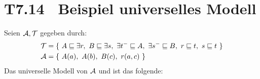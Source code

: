 \documentclass[fontsize=11pt, twoside=false, numbers=autoenddot]{scrbook}
\begin{document}
\newcommand{\BspUnivModell}{T7.14}
\section*{\hypertarget{BspUnivModell}{\BspUnivModell}~ Beispiel universelles Modell}

Seien $\mathcal{A},\mathcal{T}$ gegeben durch:
%
\begin{align*}
  \mathcal{T} & = \{\ A\sqsubseteq \exists r,\ B\sqsubseteq\exists s,\ \exists
  t^-\sqsubseteq A,\ \exists s^-\sqsubseteq B,\ r\sqsubseteq t,\
s\sqsubseteq t\ \} \\
  \mathcal{A} & = \{\ A(a),\ A(b),\ B(c),\ r(a,c)\ \}
\end{align*}
% 
Das universelle Modell \Umc von $\mathcal{A}$ und \Tmc ist das folgende: 
%
\end{document}
